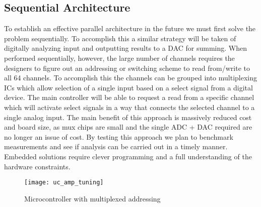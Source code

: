 \subsection{Sequential Architecture}
To establish an effective parallel architecture in the future we must first solve the problem sequentially. To accomplish this a similar strategy will be taken of digitally analyzing input and outputting results to a DAC for summing. When performed sequentially, however, the large number of channels requires the designers to figure out an addressing or switching scheme to read from/write to all 64 channels. To accomplish this the channels can be grouped into multiplexing ICs which allow selection of a single input based on a select signal from a digital device. The main controller will be able to request a read from a specific channel which will activate select signals in a way that connects the selected channel to a single analog input. The main benefit of this approach is massively reduced cost and board size, as mux chips are small and the single ADC + DAC required are no longer an issue of cost. By testing this approach we plan to benchmark measurements and see if analysis can be carried out in a timely manner. Embedded solutions require clever programming and a full understanding of the hardware constraints.
\begin{figure}[!htb]
	\centering
	\texttt{[image: uc\_amp\_tuning]}
	\caption{Microcontroller with multiplexed addressing}
\end{figure}